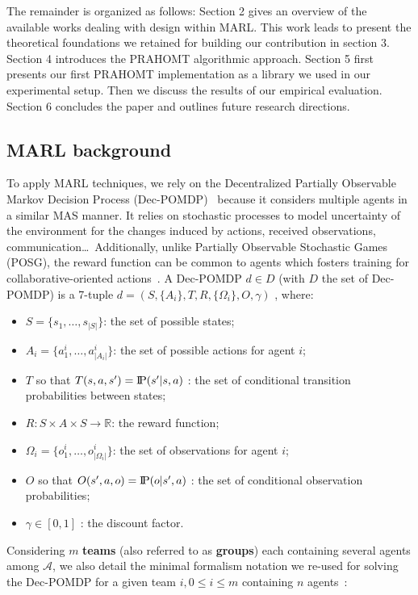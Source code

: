 \documentclass[runningheads]{llncs}
\theoremstyle{freethm}
\theoremstyle{proofoutline}
\newcommand{\probP}{\text{I\kern-0.15em P}}
\begin{document}
The remainder is organized as follows: Section 2 gives an overview of the available works dealing with design within MARL. This work leads to present the theoretical foundations we retained for building our contribution in section 3. Section 4 introduces the PRAHOMT algorithmic approach. Section 5 first presents our first PRAHOMT implementation as a library we used in our experimental setup. Then we discuss the results of our empirical evaluation. Section 6 concludes the paper and outlines future research directions.


\subsection{MARL background}

To apply MARL techniques, we rely on the Decentralized Partially Observable Markov Decision Process (Dec-POMDP)~\cite{Oliehoek2016} because it considers multiple agents in a similar MAS manner. It relies on stochastic processes to model uncertainty of the environment for the changes induced by actions, received observations, communication\dots \ Additionally, unlike Partially Observable Stochastic Games (POSG), the reward function can be common to agents which fosters training for collaborative-oriented actions~\cite{Beynier2013}.
A Dec-POMDP $d \in D$ (with $D$ the set of Dec-POMDP) is a 7-tuple $d = (S,\{A_i\},T,R,\{\Omega_i\},O,\gamma)$ , where:
\begin{itemize}
    \item $S = \{s_1,\dots,s_{|S|}\}$: the set of possible states;
    \item $A_{i} = \{a_{1}^{i},\dots,a_{|A_{i}|}^{i}\}$: the set of possible actions for agent $i$;
    \item $T$ so that $T(s,a,s') = \probP{(s'|s,a)}$ : the set of conditional transition probabilities between states;
    \item $R: S \times A \times S \rightarrow \mathbb{R}$: the reward function;
    \item $\Omega_{i} = \{o_{1}^{i},\dots,o_{|\Omega_{i}|}^{i}\}$: the set of observations for agent $i$;
    \item $O$ so that $O(s',a,o) = \probP{(o|s',a)}$ : the set of conditional observation probabilities;
    \item $\gamma \in [0,1]$ : the discount factor.
\end{itemize}

Considering $m$ \textbf{teams} (also referred to as \textbf{groups}) each containing several agents among $\mathcal{A}$, we also detail the minimal formalism notation we re-used for solving the Dec-POMDP for a given team $i, 0 \leq i \leq m$ containing $n$ agents~\cite{Beynier2013,Albrecht2024}:
\end{document}
